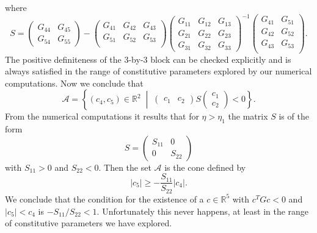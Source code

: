 \documentclass[a4paper,10pt,twoside]{amsbook}
\numberwithin{section}{chapter}
\numberwithin{equation}{chapter}
\theoremstyle{definition}
\begin{document}
where
\[
S=
\begin{pmatrix}
G_{44} & G_{45} \\
G_{54} & G_{55}
\end{pmatrix}-
\begin{pmatrix}
G_{41} & G_{42} & G_{43} \\
G_{51} & G_{52} & G_{53} \\
\end{pmatrix}
\begin{pmatrix}
G_{11} & G_{12} & G_{13} \\
G_{21} & G_{22} & G_{23} \\
G_{31} & G_{32} & G_{33}
\end{pmatrix}^{-1}
\begin{pmatrix}
G_{41} & G_{51} \\
G_{42} & G_{52} \\
G_{43} & G_{53} \\
\end{pmatrix}.
\]
The positive definiteness of the 3-by-3 block can be checked explicitly and is always satisfied in the range of constitutive parameters explored by our numerical computations. Now we conclude that
\[
\mathscr{A}=\left\{(c_4,c_5)\in\mathbb{R}^2\;\middle|\;\begin{pmatrix}
c_1 & c_2
\end{pmatrix}
S
\begin{pmatrix}
c_1 \\ c_2
\end{pmatrix}<0\right\}.
\]
From the numerical computations it results that for $\eta>\eta_1$ the matrix $S$ is of the form
\[
S=\begin{pmatrix}
S_{11} & 0 \\
0 & S_{22}
\end{pmatrix}
\]
with $S_{11}>0$ and $S_{22}<0$. Then the set $\mathscr{A}$ is the cone defined by
\[
|c_5|\ge-\frac{S_{11}}{S_{22}}|c_4|.
\] 
We conclude that the condition for the existence of a $c\in\mathbb{R}^5$ with $c^TGc<0$ and $|c_5|<c_4$ is $-S_{11}/S_{22}<1$. Unfortunately this never happens, at least in the range of constitutive parameters we have explored.
\end{document}
